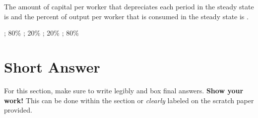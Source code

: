 \documentclass[addpoints,11pt]{exam}
\theoremstyle{definition}
\begin{document}
\begin{questions}
	The amount of capital per worker that depreciates each period in the steady state is \underline{\hspace{3cm}} and the percent of output per worker that is consumed in the steady state is \underline{\hspace{3cm}}.
	
	
	\begin{choices}
			; 80\%
			; 20\%
			; 20\%
			; 80\%
	\end{choices}
	
	
\end{questions}

\section*{Short Answer}

For this section, make sure to write legibly and box final answers. \textbf{Show your work!} This can be done within the section or \textit{clearly} labeled on the scratch paper provided.
\end{document}
